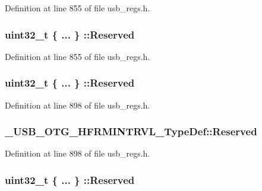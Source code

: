 Definition at line 855 of file usb\-\_\-regs.\-h.

\hypertarget{group___u_s_b___o_t_g___d_r_i_v_e_r_gaa6838f5e767e26e56c2edeeb98ca3aae}{
\subsubsection[{Reserved}]{\setlength{\rightskip}{0pt plus 5cm}uint32\-\_\-t \{ ... \} \-::Reserved}}\label{group___u_s_b___o_t_g___d_r_i_v_e_r_gaa6838f5e767e26e56c2edeeb98ca3aae}


Definition at line 855 of file usb\-\_\-regs.\-h.

\hypertarget{group___u_s_b___o_t_g___d_r_i_v_e_r_ga752bed107975887db3ff9ac30201362d}{
\subsubsection[{Reserved}]{\setlength{\rightskip}{0pt plus 5cm}uint32\-\_\-t \{ ... \} \-::Reserved}}\label{group___u_s_b___o_t_g___d_r_i_v_e_r_ga752bed107975887db3ff9ac30201362d}


Definition at line 898 of file usb\-\_\-regs.\-h.

\hypertarget{group___u_s_b___o_t_g___d_r_i_v_e_r_ga113e497b721389ae73ab4479a2bc5601}{
\subsubsection[{Reserved}]{ \-\_\-\-U\-S\-B\-\_\-\-O\-T\-G\-\_\-\-H\-F\-R\-M\-I\-N\-T\-R\-V\-L\-\_\-\-Type\-Def\-::\-Reserved}}\label{group___u_s_b___o_t_g___d_r_i_v_e_r_ga113e497b721389ae73ab4479a2bc5601}


Definition at line 898 of file usb\-\_\-regs.\-h.

\hypertarget{group___u_s_b___o_t_g___d_r_i_v_e_r_ga534b4962e27941da1f12fbb25674b869}{
\subsubsection[{Reserved}]{\setlength{\rightskip}{0pt plus 5cm}uint32\-\_\-t \{ ... \} \-::Reserved}}\label{group___u_s_b___o_t_g___d_r_i_v_e_r_ga534b4962e27941da1f12fbb25674b869}


